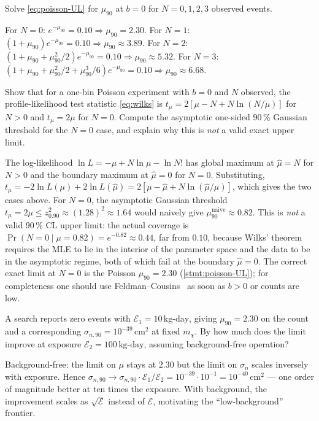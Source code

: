 \begin{exercise}
Solve \cref{eq:poisson-UL} for $\mu_{90}$ at $b=0$ for $N=0,1,2,3$
observed events.
\begin{solution}
For $N=0$: $e^{-\mu_{90}}=0.10\Rightarrow\mu_{90}=2.30$.
For $N=1$: $(1+\mu_{90})e^{-\mu_{90}}=0.10\Rightarrow\mu_{90}\approx 3.89$.
For $N=2$: $(1+\mu_{90}+\mu_{90}^2/2)e^{-\mu_{90}}=0.10\Rightarrow\mu_{90}\approx 5.32$.
For $N=3$: $(1+\mu_{90}+\mu_{90}^2/2+\mu_{90}^3/6)e^{-\mu_{90}}=0.10
\Rightarrow\mu_{90}\approx 6.68$.
\end{solution}
\end{exercise}

\begin{exercise}[Profile-likelihood test statistic, $b=0$]
Show that for a one-bin Poisson experiment with $b=0$ and $N$
observed, the profile-likelihood test statistic
\cref{eq:wilks} is
$t_\mu=2[\mu-N+N\ln(N/\mu)]$ for $N>0$ and $t_\mu=2\mu$ for $N=0$.
Compute the asymptotic one-sided 90\,\% Gaussian threshold for
the $N=0$ case, and explain why this is \emph{not} a valid
exact upper limit.
\begin{solution}
The log-likelihood $\ln L=-\mu+N\ln\mu-\ln N!$ has global maximum
at $\hat\mu=N$ for $N>0$ and the boundary maximum at $\hat\mu=0$
for $N=0$. Substituting,
$t_\mu=-2\ln L(\mu)+2\ln L(\hat\mu)=2[\mu-\hat\mu+N\ln(\hat\mu/\mu)]$,
which gives the two cases above. For $N=0$, the asymptotic
Gaussian threshold $t_\mu= 2\mu \leq z_{0.90}^2 \approx (1.28)^2
\approx 1.64$ would naively give $\mu^{\text{naive}}_{90}\approx 0.82$.
This is \emph{not} a valid 90\,\% CL upper limit: the actual
coverage is $\Pr(N=0\mid \mu=0.82)=e^{-0.82}\approx 0.44$, far
from $0.10$, because Wilks' theorem requires the MLE to lie in
the interior of the parameter space and the data to be in the
asymptotic regime, both of which fail at the boundary
$\hat\mu=0$. The correct exact limit at $N=0$ is the Poisson
$\mu_{90}=2.30$ (\cref{stmt:poisson-UL}); for completeness one
should use Feldman--Cousins~\cite{feldman1998} as soon as $b>0$
or counts are low.
\end{solution}
\end{exercise}

\begin{exercise}
A search reports zero events with $\mathcal E_1=10\,\text{kg-day}$,
giving $\mu_{90}=2.30$ on the count and a corresponding
$\sigma_{n,90}=10^{-39}\,\text{cm}^2$ at fixed $m_\chi$. By how
much does the limit improve at exposure
$\mathcal E_2=100\,\text{kg-day}$, assuming background-free
operation?
\begin{solution}
Background-free: the limit on $\mu$ stays at $2.30$ but the
limit on $\sigma_n$ scales inversely with exposure. Hence
$\sigma_{n,90}\to\sigma_{n,90}\cdot\mathcal E_1/\mathcal E_2=10^{-39}\cdot 10^{-1}
=10^{-40}\,\text{cm}^2$ --- one order of magnitude better at ten
times the exposure. With background, the improvement scales as
$\sqrt{\mathcal E}$ instead of $\mathcal E$, motivating the
``low-background'' frontier.
\end{solution}
\end{exercise}

